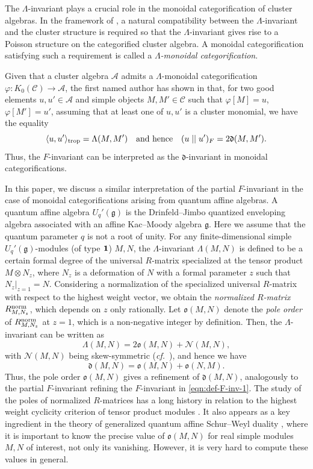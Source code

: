 \documentclass[12pt]{amsart}
\theoremstyle{definition}
\theoremstyle{remark}
\numberwithin{equation}{section}
\newcommand{\confer}{\textit{cf.}\ }
\begin{document}
The $\Lambda$-invariant plays a crucial role in the monoidal categorification of cluster algebras.
In the framework of \cite{kkko-2018, kkop-2020}, a natural compatibility between the $\Lambda$-invariant and the cluster structure is required so that the $\Lambda$-invariant gives rise to a Poisson structure on the categorified cluster algebra. A monoidal categorification satisfying such a requirement is called a \emph{$\mathsf{\Lambda}$-monoidal categorification}.  

Given that a cluster algebra $\mathcal{A}$ admits a $\mathsf{\Lambda}$-monoidal categorification $\varphi \colon K_0(\mathcal{C}) \to \mathcal{A}$, the first named author has shown in \cite[Theorem 5.16]{Cao-2023} that, for two good elements $u, u' \in \mathcal{A}$ and simple objects $M,M' \in \mathcal{C}$ such that $\varphi[M] = u$, $\varphi[M'] = u'$, assuming that at least one of $u,u'$ is a cluster monomial, we have the equality  
\[  \langle u,u' \rangle_{\rm trop} = \Lambda(M,M') \quad \text{and hence} \quad (u \mid\mid u')_F = 2\mathfrak{d}(M,M').\]
Thus, the $F$-invariant can be interpreted as the $\mathfrak{d}$-invariant in monoidal categorifications. 

In this paper, we discuss a similar interpretation of the partial $F$-invariant in the case of monoidal categorifications arising from quantum affine algebras.
A quantum affine algebra $U_q'(\mathfrak{g})$ is the Drinfeld--Jimbo quantized enveloping algebra associated with an affine Kac--Moody algebra $\mathfrak{g}$.
Here we assume that the quantum parameter $q$ is not a root of unity. 
For any finite-dimensional simple $U_q'(\mathfrak{g})$-modules (of type ${\bf 1}$) $M, N$, the $\Lambda$-invariant $\Lambda(M,N)$ is defined to be a certain formal degree of the universal $R$-matrix specialized at the tensor product $M\otimes N_z$, where $N_z$ is a deformation of $N$ with a formal parameter $z$ such that $N_{z}|_{z=1} = N$. Considering a normalization of the specialized universal $R$-matrix with respect to the highest weight vector, we obtain the {\em normalized $R$-matrix} $R_{M,N_z}^{\rm norm}$, which depends on $z$ only rationally. Let $\mathfrak{o}(M,N)$ denote the {\em pole order} of $R_{M,N_z}^{\rm norm}$ at $z=1$, which is a non-negative integer by definition. 
 Then, the $\Lambda$-invariant can be written as
\[ \Lambda(M,N) = 2 \mathfrak{o}(M,N) + \mathscr{N}(M,N),\] 
with $\mathscr{N}(M,N)$ being skew-symmetric (\confer \cite{kkop-2020,Fujita-Oh-2021}), and hence we have
\[ \mathfrak{d}(M,N) = \mathfrak{o}(M,N) + \mathfrak{o}(N,M).\]
Thus, the pole order $\mathfrak{o}(M,N)$ gives a refinement of $\mathfrak{d}(M,N)$, analogously to the partial $F$-invariant refining the $F$-invariant in \eqref{eqn:def-F-inv-1}.
The study of the poles of normalized $R$-matrices has a long history in relation to the highest weight cyclicity criterion of tensor product modules \cite{AK97, Kas02, KKKO-2015}. It also appears as a key ingredient in the theory of generalized quantum affine Schur--Weyl duality \cite{KKK-2018R}, where it is important to know the precise value of $\mathfrak{o}(M,N)$ for real simple modules $M,N$ of interest, not only its vanishing.
However, it is very hard to compute these values in general.
\end{document}
